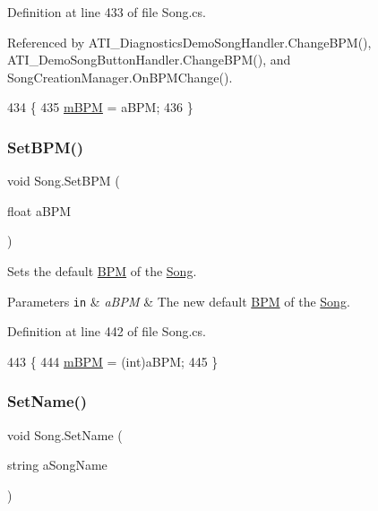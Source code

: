 Definition at line 433 of file Song.\+cs.



Referenced by A\+T\+I\+\_\+\+Diagnostics\+Demo\+Song\+Handler.\+Change\+B\+P\+M(), A\+T\+I\+\_\+\+Demo\+Song\+Button\+Handler.\+Change\+B\+P\+M(), and Song\+Creation\+Manager.\+On\+B\+P\+M\+Change().


\begin{DoxyCode}
434     \{
435         \hyperlink{group___song_priv_var_ga3341fbbd9c0c58fe6514623e6b6c5a1e}{mBPM} = aBPM;
436     \}
\end{DoxyCode}
\mbox{\label{group___song_pub_func_ga1efefe19fd0c5962f7f8ed16c65cd835}} 
\subsubsection{\texorpdfstring{Set\+B\+P\+M()}{SetBPM()}\hspace{0.1cm}{\footnotesize\ttfamily [2/2]}}
{\footnotesize\ttfamily void Song.\+Set\+B\+PM (\begin{DoxyParamCaption}\item[{float}]{a\+B\+PM }\end{DoxyParamCaption})}



Sets the default \hyperlink{group___audio_DefBPM}{B\+PM} of the \hyperlink{class_song}{Song}. 


\begin{DoxyParams}[1]{Parameters}
\mbox{\tt in}  & {\em a\+B\+PM} & The new default \hyperlink{group___audio_DefBPM}{B\+PM} of the \hyperlink{class_song}{Song}. \\
\hline
\end{DoxyParams}


Definition at line 442 of file Song.\+cs.


\begin{DoxyCode}
443     \{
444         \hyperlink{group___song_priv_var_ga3341fbbd9c0c58fe6514623e6b6c5a1e}{mBPM} = (int)aBPM;
445     \}
\end{DoxyCode}
\mbox{\label{group___song_pub_func_gacb01510cf72657fc7c64bb6ba00c2c56}} 
\subsubsection{\texorpdfstring{Set\+Name()}{SetName()}}
{\footnotesize\ttfamily void Song.\+Set\+Name (\begin{DoxyParamCaption}\item[{string}]{a\+Song\+Name }\end{DoxyParamCaption})}



